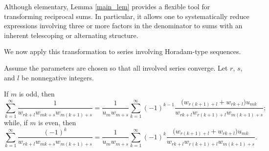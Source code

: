 \documentclass[12pt,reqno]{article}
\begin{document}
Although elementary, Lemma \ref{main_lem} provides a flexible tool for transforming reciprocal sums. In particular, it allows one to systematically reduce expressions involving three or more factors in the denominator to sums with an inherent telescoping or alternating structure.

We now apply this transformation to series involving Horadam-type sequences.
\begin{theorem}\label{thm:main_transform}
	Assume the parameters are chosen so that all involved series converge. Let $r$, $s$, and $l$ be nonnegative integers.
	
	If $m$ is odd, then
		\begin{equation}\label{Th1_1}
		\sum_{k=1}^\infty
		\frac{1}{w_{rk+l}w_{mk+s}w_{m(k+1)+s}}
		=
		\frac{1}{u_m w_{m+s}}
		\sum_{k=1}^\infty (-1)^{k-1}
		\frac{\bigl(w_{r(k+1)+l}+w_{rk+l}\bigr)u_{mk}}
		{w_{rk+l} w_{r(k+1)+l} w_{m(k+1)+s}};
		\end{equation}
	while, if $m$ is even, then
		\begin{equation}\label{Th1_2}
		\sum_{k=1}^\infty
		\frac{(-1)^k}{w_{rk+l}w_{mk+s}w_{m(k+1)+s}}
		=
		\frac{1}{u_m w_{m+s}}
		\sum_{k=1}^\infty (-1)^k
		\frac{\bigl(w_{r(k+1)+l}+w_{rk+l}\bigr)u_{mk}}
		{w_{rk+l} w_{r(k+1)+l} w_{m(k+1)+s}}.
		\end{equation}
\end{theorem}
\end{document}
